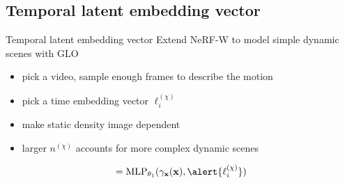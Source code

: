 \documentclass[aspectratio=1610]{beamer}
\begin{document}
\subsection{Temporal latent embedding vector}
\begin{frame}{Temporal latent embedding vector}
    Extend NeRF-W to model simple dynamic scenes with GLO 
    \bigskip
    \pause
    \begin{figure}
    \end{figure}
    \pause
    \begin{itemize}
        \item pick a video, sample enough frames to describe the motion
        \item pick a time embedding vector \(\ell_i^{(\chi)}\) 
        \item make static density image dependent
        \item larger \(n^{(\chi)}\) accounts for more complex dynamic scenes 
    \end{itemize}
    \bigskip
    \begin{equation*}
        [\sigma_i(t), \vb{z}_i(t)] = \textrm{MLP}_{\theta_1} (\gamma_{\vb{x}}(\vb{x}), \alert{\ell_i^{(\chi)}})
    \end{equation*}    
\end{frame}
\end{document}
